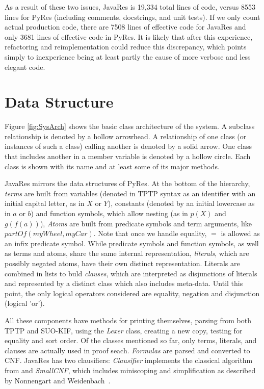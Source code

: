 \documentclass{llncs}
\begin{document}
As a result of these two issues, JavaRes is 19,334 total
lines of code, versus 8553 lines for PyRes (including comments,
docstrings, and unit tests). If we only count actual production code,
there are 7508 lines of effective code for JavaRes and only 3681 lines of
effective code in PyRes.  It is likely that after this experience,
refactoring and reimplementation could reduce this
discrepancy, which points simply to inexperience being at least partly
the cause of more verbose and less elegant code.


\section{Data Structure}

Figure \ref{fig:SysArch} shows the basic class architecture of the
system. A subclass relationship is denoted by a hollow arrowhead.  A
relationship of one class (or instances of such a class) calling
another is denoted by a solid arrow.  One class that includes another
in a member variable is denoted by a hollow circle.  Each class is
shown with its name and at least some of its major methods.

JavaRes mirrors the data structures of PyRes.  At the bottom of the
hierarchy, \emph{terms} are built from variables (denoted in TPTP
syntax as an identifier with an initial capital letter, as in $X$ or
$Y$), constants (denoted by an initial lowercase as in $a$ or $b$) and
function symbols, which allow nesting (as in $p(X)$ and $g(f(a))$),
\emph{Atoms} are built from predicate symbols and term arguments, like
$partOf(myWheel,myCar)$.  Note that once we handle equality, $=$ is
allowed as an infix predicate symbol. While predicate symbols and
function symbols, as well as terms and atoms, share the same internal
representation, \emph{literals}, which are possibly negated atoms,
have their own distinct representation. Literals are combined in lists
to buld \emph{clauses}, which are interpreted as disjunctions of
literals and represented by a distinct class which also includes
meta-data.  Until this point, the only logical operators considered
are equality, negation and disjunction (logical 'or').

All these components have methods for printing themselves, parsing
from both TPTP and SUO-KIF, using the \emph{Lexer} class, creating a new
copy, testing for equality and sort order. Of the classes mentioned so
far, only terms, literals, and clauses are actually used in proof
seach.  \emph{Formulas} are parsed and converted to CNF.  JavaRes has
two clausifiers: \emph{Clausifier} implements the classical algorithm
from \cite{RN:AI-95} and \emph{SmallCNF}, which includes miniscoping
and simplification as described by Nonnengart and
Weidenbach~\cite{NW:SmallCNF-2001}.
\end{document}
